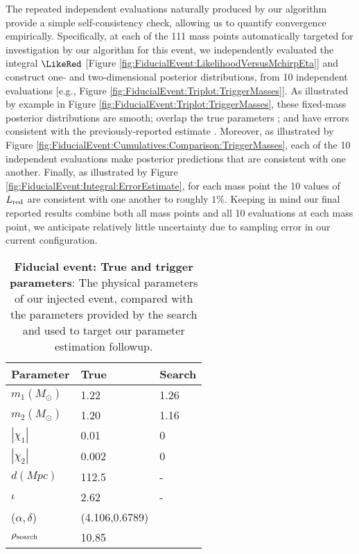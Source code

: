 The repeated independent evaluations naturally produced by our algorithm provide a simple self-consistency check,
allowing us to quantify convergence empirically.  
Specifically, at each of the 111 mass points automatically targeted for investigation by our algorithm for this event, we
independently evaluated the integral $\LikeRed$ [Figure \ref{fig:FiducialEvent:LikelihoodVersusMchirpEta}] and construct one- and two-dimensional posterior distributions, from
10 independent evaluations [e.g., Figure \ref{fig:FiducialEvent:Triplot:TriggerMasses}].    
%
As illustrated by example in Figure \ref{fig:FiducialEvent:Triplot:TriggerMasses}, these fixed-mass posterior
distributions are smooth; overlap the true parameters ; and have errors
consistent  with the previously-reported estimate .  
%
Moreover, as illustrated by Figure \ref{fig:FiducialEvent:Cumulatives:Comparison:TriggerMasses}, each of the 10
independent evaluations make posterior predictions that are consistent with one another.   
%
Finally, as illustrated by Figure \ref{fig:FiducialEvent:Integral:ErrorEstimate}, for each mass point the 10 values of $L_{\rm red}$
are consistent with one another to roughly $1\%$.  
%
Keeping in mind our final reported results combine both all mass points and all 10 evaluations at each mass point, we
anticipate relatively little uncertainty due to sampling error in our current configuration.  


\begin{table}
\begin{tabular}{l|ll}
Parameter & True & Search \\ \hline
$m_1 (M_\odot)$ &  1.22 & 1.26 \\
$m_2 (M_\odot)$ &  1.20 & 1.16 \\
$|\chi_1| $ & 0.01  & 0 \\
$|\chi_2| $ & 0.002 & 0 \\
$d (\unit{Mpc}) $ & 112.5 & - \\
$\iota $ & 2.62 & - \\
($\alpha,\delta$) & (4.106,0.6789) &\\ 
$\rho_{\rm search}$ & 10.85 \\
\end{tabular}
\caption{\label{tab:FiducialEvent:Parameters}\textbf{Fiducial event: True and trigger parameters}: The physical parameters of our injected event, compared
  with the parameters provided by the search and used to target our parameter estimation followup.
}
\end{table}

